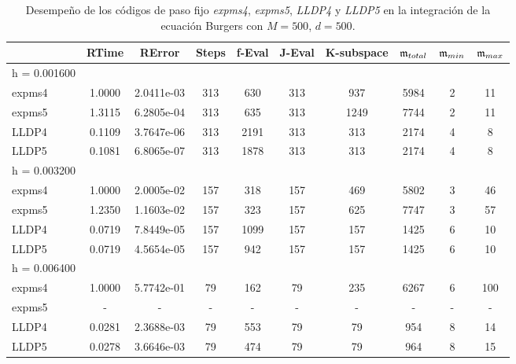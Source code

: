 \begin{table}[htb]
	\caption{Desempeño de los códigos de paso fijo \emph{expms4}, \emph{expms5}, \emph{LLDP4} y \emph{LLDP5} en la integración de la ecuación Burgers con $M=500$, $d=500$.}
	\centering
	\begin{adjustbox}{width=0.95\columnwidth,center}
		\begin{tabular}{lccccccccc}
			\hline
			& RTime & RError & Steps & f-Eval & J-Eval & K-subspace & $\mathfrak{m}_{total}$ & $\mathfrak{m}_{min}$ & $\mathfrak{m}_{max}$ \\
			\hline
			h = 0.001600 &  &  &  &  &  &  &  &  &  \\
			expms4 & 1.0000 & 2.0411e-03 & 313 & 630 & 313 & 937 & 5984 & 2 & 11  \\
			expms5 & 1.3115 & 6.2805e-04 & 313 & 635 & 313 & 1249 & 7744 & 2 & 11  \\
			LLDP4 & 0.1109 & 3.7647e-06 & 313 & 2191 & 313 & 313 & 2174 & 4 & 8  \\
			LLDP5 & 0.1081 & 6.8065e-07 & 313 & 1878 & 313 & 313 & 2174 & 4 & 8  \\
			\hline
			h = 0.003200 &  &  &  &  &  &  &  &  &  \\
			expms4 & 1.0000 & 2.0005e-02 & 157 & 318 & 157 & 469 & 5802 & 3 & 46  \\
			expms5 & 1.2350 & 1.1603e-02 & 157 & 323 & 157 & 625 & 7747 & 3 & 57  \\
			LLDP4 & 0.0719 & 7.8449e-05 & 157 & 1099 & 157 & 157 & 1425 & 6 & 10  \\
			LLDP5 & 0.0719 & 4.5654e-05 & 157 & 942 & 157 & 157 & 1425 & 6 & 10  \\
			\hline
			h = 0.006400 &  &  &  &  &  &  &  &  &  \\
			expms4 & 1.0000 & 5.7742e-01 & 79 & 162 & 79 & 235 & 6267 & 6 & 100  \\
			expms5 & - & - & - & - & - & - &- & - & -\\
			LLDP4 & 0.0281 & 2.3688e-03 & 79 & 553 & 79 & 79 & 954 & 8 & 14  \\
			LLDP5 & 0.0278 & 3.6646e-03 & 79 & 474 & 79 & 79 & 964 & 8 & 15  \\
			\hline
		\end{tabular}
	\end{adjustbox}
	\label{tab:num-exp-lldp-fix-step:bgna}
\end{table}

\vspace{0.5cm}

